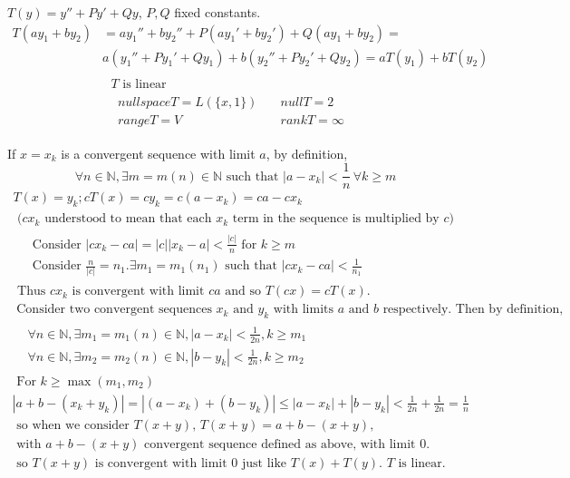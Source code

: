 \documentclass[twoside]{amsart}
\theoremstyle{plain}
\theoremstyle{definition}
\newcommand{\exercisehead}[1]
  {
   \noindent{\small\bf Exercise #1.}
   \smallskip}
\begin{document}
\exercisehead{27} $T(y) = y'' + Py' + Qy$, $P,Q$ fixed constants.  \\
\begin{align*} 
 T(a y_1 + b y_2) & = a y_1'' + by_2 '' + P(ay_1' + by_2') + Q(ay_1 + by_2 ) = \\
 & a(y_1''+ Py_1' +Qy_1 ) + b(y_2''+Py_2' + Qy_2 ) = aT(y_1) +bT(y_2) \\ \\
 & \text{ $T$ is linear } \\
 & \begin{aligned}
   & nullspace T = L(\{ x,1 \}) \quad & null{T} = 2 \\
   & range T = V \quad & rank T = \infty 
\end{aligned}
\end{align*}

\exercisehead{28} If $x=x_k$ is a convergent sequence with limit $a$, by definition, 
\[
\forall n \in \mathbb{N}, \exists m = m(n) \in \mathbb{N} \text{ such that } |a -x_k| < \frac{1}{n} \, \forall k \geq m 
\]
\[
\begin{gathered}
  T(x) = y_k; cT(x) = cy_k = c(a- x_k) = ca - cx_k \\ 
  \text{ ($cx_k$ understood to mean that each $x_k$ term in the sequence is multiplied by $c$) } \\
  \begin{aligned}
    &\text{ Consider } |cx_k - ca | = |c| |x_k -a | < \frac{ |c| }{ n} \text{ for } k \geq m \\
    & \text{ Consider } \frac{n}{ |c|} = n_1.  \exists m_1 = m_1(n_1) \text{ such that } |cx_k - ca| < \frac{1}{n_1} 
  \end{aligned} \\
  \text{ Thus $cx_k$ is convergent with limit $ca$ and so $T(cx) = cT(x)$. }
\end{gathered}
\]
\[
\begin{gathered}
\text{ Consider two convergent sequences $x_k$ and $y_k$ with limits $a$ and $b$ respectively.  Then by definition, } \\
\begin{aligned}
  & \forall n \in \mathbb{N}, \exists m_1 = m_1(n) \in \mathbb{N}, |a-x_k| < \frac{1}{2n}, k \geq m_1 \\
  & \forall n \in \mathbb{N}, \exists m_2 = m_2(n) \in \mathbb{N}, |b-y_k| < \frac{1}{2n}, k \geq m_2
\end{aligned} \\
\text{ For } k \geq \max(m_1,m_2) \\ 
|a+b - (x_k + y_k) | = |(a- x_k) + (b- y_k )| \leq |a-x_k| + |b- y_k| < \frac{1}{2n} + \frac{1}{2n} = \frac{1}{n} \\
\text{ so when we consider $T(x+y)$, $T(x+y) = a+b - (x+y)$, } \\
\text{ with $a +b - (x+y)$ convergent sequence defined as above, with limit $0$. } \\
\text{ so } T(x+y) \text{ is convergent with limit $0$ just like $T(x)+T(y)$.  $T$ is linear. }
\end{gathered}
\]
\end{document}

